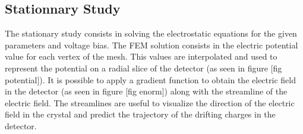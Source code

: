 \begin{table}[]
\centering
{}%
\caption{List and Value of the default parameters for FID38}
\label{tab:fid38-default-parameters}
\end{table}

\subsection{Stationnary Study}

The stationary study consists in solving the electrostatic equations for the given parameters and voltage bias. The FEM solution consists in the electric potential value for each vertex of the mesh. This values are interpolated and used to represent the potential on a radial slice of the detector (as seen in figure [fig potential]). It is possible to apply a gradient function to obtain the electric field in the detector (as seen in figure [fig enorm]) along with the streamline of the electric field. The streamlines are useful to visualize the direction of the electric field in the crystal and predict the trajectory of the drifting charges in the detector.



